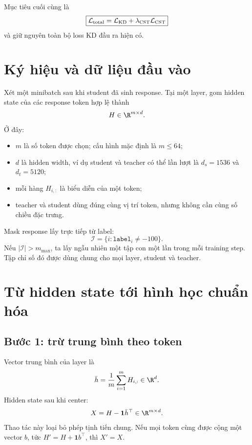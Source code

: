 \documentclass{article}
\newcommand{\cst}{\textsc{CST}}
\begin{document}
Mục tiêu cuối cùng là
\begin{equation}
 \boxed{
 \mathcal L_{\mathrm{total}}
 =\mathcal L_{\mathrm{KD}}
 +\lambda_{\cst}\mathcal L_{\cst}}
 \label{eq:total}
\end{equation}
và giữ nguyên toàn bộ loss KD đầu ra hiện có.

\section{Ký hiệu và dữ liệu đầu vào}

Xét một minibatch sau khi student đã sinh response.  Tại một layer, gom hidden
state của các response token hợp lệ thành
\begin{equation}
 H\in\R^{m\times d}.
\end{equation}
Ở đây:
\begin{itemize}
 \item $m$ là số token được chọn; cấu hình mặc định là $m\leq64$;
 \item $d$ là hidden width, ví dụ student và teacher có thể lần lượt là
 $d_s=1536$ và $d_t=5120$;
 \item mỗi hàng $H_{i,:}$ là biểu diễn của một token;
 \item teacher và student dùng đúng cùng vị trí token, nhưng không cần cùng
 số chiều đặc trưng.
\end{itemize}

Mask response lấy trực tiếp từ label:
\begin{equation}
 \mathcal I=\{i:\texttt{label}_i\neq-100\}.
\end{equation}
Nếu $|\mathcal I|>m_{\max}$, ta lấy ngẫu nhiên một tập con một lần trong mỗi
training step.  Tập chỉ số đó được dùng chung cho mọi layer, student và teacher.

\section{Từ hidden state tới hình học chuẩn hóa}

\subsection{Bước 1: trừ trung bình theo token}

Vector trung bình của layer là
\begin{equation}
 \bar h=\frac{1}{m}\sum_{i=1}^{m}H_{i,:}\in\R^d.
\end{equation}
Hidden state sau khi center:
\begin{equation}
 X=H-\mathbf 1\bar h^\top\in\R^{m\times d}.
 \label{eq:center}
\end{equation}
Thao tác này loại bỏ phép tịnh tiến chung.  Nếu mọi token cùng được cộng một
vector $b$, tức $H'=H+\mathbf1b^\top$, thì $X'=X$.
\end{document}
